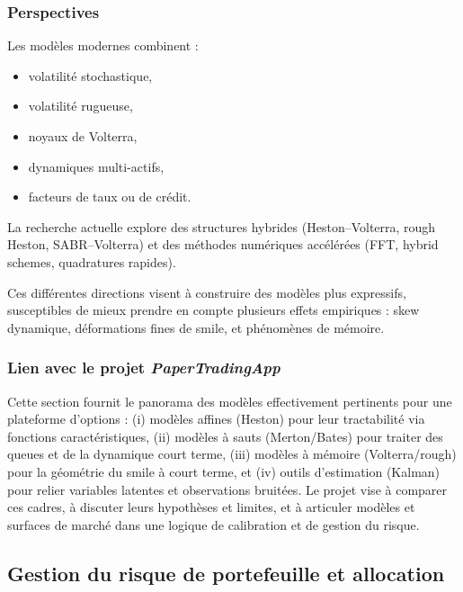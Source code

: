 \documentclass[11pt,a4paper]{article}
\newcommand{\1}{\mathbf{1}}
\begin{document}
\subsubsection{Perspectives}

Les mod\`eles modernes combinent :
\begin{itemize}
  \item volatilité stochastique,
  \item volatilité rugueuse,
  \item noyaux de Volterra,
  \item dynamiques multi-actifs,
  \item facteurs de taux ou de crédit.
\end{itemize}

La recherche actuelle explore des structures hybrides (Heston--Volterra,
rough Heston, SABR--Volterra) et des méthodes numériques accélérées (FFT,
hybrid schemes, quadratures rapides).

Ces diff\'erentes directions visent \`a construire des mod\`eles plus expressifs, susceptibles de mieux prendre en compte
plusieurs effets empiriques : skew dynamique, d\'eformations fines de smile, et ph\'enom\`enes de m\'emoire.





\subsubsection{Lien avec le projet \emph{PaperTradingApp}}

Cette section fournit le panorama des mod\`eles effectivement pertinents pour une plateforme d'options : (i) mod\`eles affines (Heston) pour
leur tractabilit\'e via fonctions caract\'eristiques, (ii) mod\`eles \`a sauts (Merton/Bates) pour traiter des queues et de la dynamique court terme,
(iii) mod\`eles \`a m\'emoire (Volterra/rough) pour la g\'eom\'etrie du smile \`a court terme, et (iv) outils d'estimation (Kalman) pour relier variables
latentes et observations bruit\'ees. Le projet vise \`a comparer ces cadres, \`a discuter leurs hypoth\`eses et limites, et \`a articuler mod\`eles et
surfaces de march\'e dans une logique de calibration et de gestion du risque.

\subsection{Gestion du risque de portefeuille et allocation}
\end{document}
